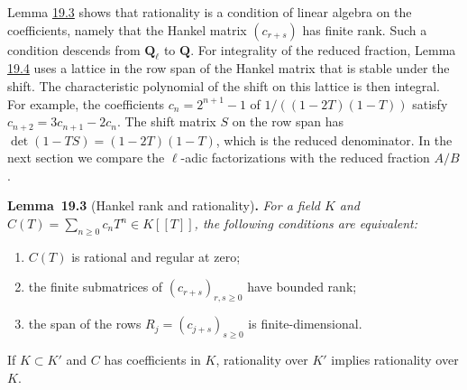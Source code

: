 \documentclass[11pt]{article}
\newenvironment{bpstatement}[2]{\par\addvspace{0.6\baselineskip}\noindent\textbf{#1}#2\textbf{.}\enspace\ignorespaces}
  {\par\addvspace{0.4\baselineskip}}
\newenvironment{bpstatementit}[2]{\begin{bpstatement}{#1}{#2}\itshape\ignorespaces}{\end{bpstatement}}
\begin{document}
Lemma \hyperref[bp330]{19.3} shows that rationality is a condition of linear algebra on the coefficients, namely that the Hankel matrix \((c_{r+s})\) has finite rank. Such a condition descends from \(\mathbf Q_\ell\) to \(\mathbf Q\). For integrality of the reduced fraction, Lemma \hyperref[bp333]{19.4} uses a lattice in the row span of the Hankel matrix that is stable under the shift. The characteristic polynomial of the shift on this lattice is then integral. For example, the coefficients \(c_n=2^{n+1}-1\) of \(1/((1-2T)(1-T))\) satisfy \(c_{n+2}=3c_{n+1}-2c_n\). The shift matrix \(S\) on the row span has \(\det(1-TS)=(1-2T)(1-T)\), which is the reduced denominator. In the next section we compare the \(\ell\)-adic factorizations with the reduced fraction \(A/B\).

\label{bp330}%
\begin{bpstatementit}{Lemma~19.3}{ (Hankel rank and rationality)}
For a field \(K\) and \(C(T)=\sum_{n\geq0}c_nT^n\in K[[T]]\), the following conditions are equivalent:

\begin{enumerate}
\item \(C(T)\) is rational and regular at zero;
\item the finite submatrices of \((c_{r+s})_{r,s\geq0}\) have bounded rank;
\item the span of the rows \(R_j=(c_{j+s})_{s\geq0}\) is finite-dimensional.
\end{enumerate}

If \(K\subset K'\) and \(C\) has coefficients in \(K\), rationality over \(K'\) implies rationality over \(K\).
\end{bpstatementit}
\end{document}
